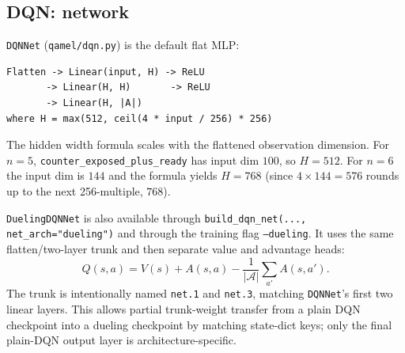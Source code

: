 \documentclass[11pt]{article}
\newcommand{\code}[1]{\texttt{#1}}
\newcommand{\file}[1]{\texttt{\small #1}}
\begin{document}
\subsection{DQN: network}
\code{DQNNet} (\file{qamel/dqn.py}) is the default flat MLP:
\begin{verbatim}
Flatten -> Linear(input, H) -> ReLU
       -> Linear(H, H)       -> ReLU
       -> Linear(H, |A|)
where H = max(512, ceil(4 * input / 256) * 256)
\end{verbatim}
The hidden width formula scales with the flattened observation dimension. For $n=5$, \code{counter\_exposed\_plus\_ready} has input dim $100$, so $H=512$. For $n=6$ the input dim is $144$ and the formula yields $H=768$ (since $4\times144=576$ rounds up to the next 256-multiple, $768$).

\code{DuelingDQNNet} is also available through \code{build\_dqn\_net(..., net\_arch="dueling")} and through the training flag \code{--dueling}. It uses the same flatten/two-layer trunk and then separate value and advantage heads:
\begin{equation*}
Q(s,a) = V(s) + A(s,a) - \frac{1}{|\mathcal{A}|}\sum_{a'} A(s,a').
\end{equation*}
The trunk is intentionally named \code{net.1} and \code{net.3}, matching \code{DQNNet}'s first two linear layers. This allows partial trunk-weight transfer from a plain DQN checkpoint into a dueling checkpoint by matching state-dict keys; only the final plain-DQN output layer is architecture-specific.
\end{document}
